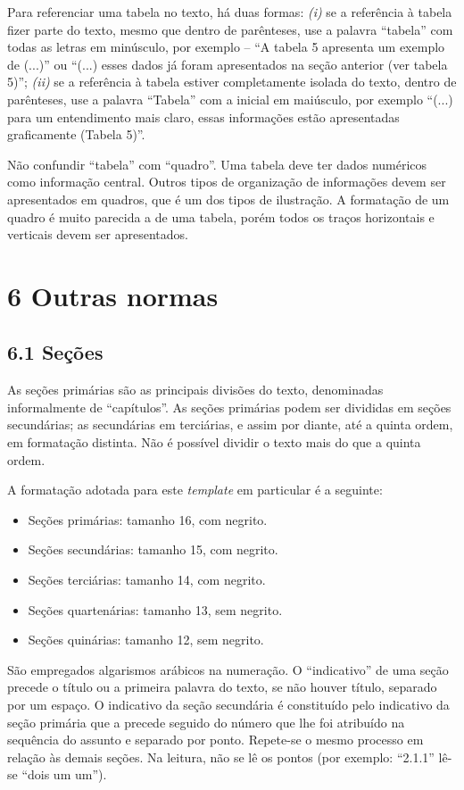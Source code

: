 \documentclass[
	12pt,				%
	oneside,			%
	a4paper,			%
	english,			%
	brazil				%
	]{abntex2ppgsi}
\begin{document}
\begin{anexosenv}
Para referenciar uma tabela no texto, há duas formas: \textit{(i)} se a referência à tabela fizer parte do texto, mesmo que dentro de parênteses, use a palavra ``tabela'' com todas as letras em minúsculo, por exemplo – ``A tabela 5 apresenta um exemplo de (...)'' ou ``(...) esses dados já foram apresentados na seção anterior (ver tabela 5)''; \textit{(ii)} se a referência à tabela estiver completamente isolada do texto, dentro de parênteses, use a palavra ``Tabela'' com a inicial em maiúsculo, por exemplo ``(...) para um entendimento mais claro, essas informações estão apresentadas graficamente (Tabela 5)''.

Não confundir ``tabela'' com ``quadro''. Uma tabela deve ter dados numéricos como informação central. Outros tipos de organização de informações devem ser apresentados em quadros, que é um dos tipos de ilustração. A formatação de um quadro é muito parecida a de uma tabela, porém todos os traços horizontais e verticais devem ser apresentados.

\section*{6 Outras normas}

\subsection*{6.1 Seções}

As seções primárias são as principais divisões do texto, denominadas informalmente de ``capítulos''. As seções primárias podem ser divididas em seções secundárias; as secundárias em terciárias, e assim por diante, até a quinta ordem, em formatação distinta. Não é possível dividir o texto mais do que a quinta ordem.

A formatação adotada para este \textit{template} em particular é a seguinte:

\begin{itemize}
	\item Seções primárias: tamanho 16, com negrito.
	\item Seções secundárias: tamanho 15, com negrito.
	\item Seções terciárias: tamanho 14, com negrito.
	\item Seções quartenárias: tamanho 13, sem negrito.
	\item Seções quinárias: tamanho 12, sem negrito.
\end{itemize}

São empregados algarismos arábicos na numeração. O ``indicativo'' de uma seção precede o título ou a primeira palavra do texto, se não houver título, separado por um espaço. O indicativo da seção secundária é constituído pelo indicativo da seção primária que a precede seguido do número que lhe foi atribuído na sequência do assunto e separado por ponto. Repete-se o mesmo processo em relação às demais seções. Na leitura, não se lê os pontos (por exemplo: ``2.1.1'' lê-se ``dois um um'').


\end{anexosenv}
\end{document}

